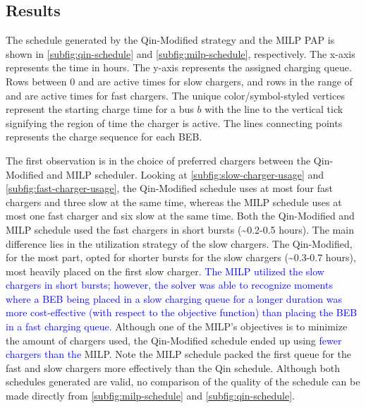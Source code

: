 \documentclass[utf8]{FrontiersinHarvard}
\newcommand{\fast}{15 }                                                         %
\newcommand{\slow}{15 }                                                         %
\begin{document}
\subsection{Results}
\label{results}
The schedule generated by the Qin-Modified strategy and the MILP PAP is shown in \autoref{subfig:qin-schedule} and
\autoref{subfig:milp-schedule}, respectively. The x-axis represents the time in hours. The y-axis represents the
assigned charging queue. Rows between 0 and \fpeval{\slow - 1} are active times for slow chargers, and rows in the range
of \fpeval{\slow - 1} and \fpeval{\fast + \slow - 1} are active times for fast chargers. The unique color/symbol-styled
vertices represent the starting charge time for a bus \(b\) with the line to the vertical tick signifying the region of
time the charger is active. The lines connecting points represents the charge sequence for each BEB.

The first observation is in the choice of preferred chargers between the Qin-Modified and MILP scheduler. Looking at
\autoref{subfig:slow-charger-usage} and \autoref{subfig:fast-charger-usage}, the Qin-Modified schedule uses at most four
fast chargers and three slow at the same time, whereas the MILP schedule uses at most one fast charger and six slow at
the same time. Both the Qin-Modified and MILP schedule used the fast chargers in short bursts (\textasciitilde{}0.2-0.5 hours). The main
difference lies in the utilization strategy of the slow chargers. The Qin-Modified, for the most part, opted for shorter
bursts for the slow chargers (\textasciitilde{}0.3-0.7 hours), most heavily placed on the first slow charger. \textcolor{blue}{The MILP utilized the slow chargers in short bursts; however, the solver was able to recognize moments where a BEB being placed in a slow charging queue for a longer duration was more cost-effective (with respect to the objective function) than placing the BEB in a fast charging queue.} Although one of the MILP's objectives is to minimize the amount of chargers
used, the Qin-Modified schedule ended up using \textcolor{blue}{fewer chargers than the} MILP. Note the MILP schedule
packed the first queue for the fast and slow chargers more effectively than the Qin schedule. Although both schedules
generated are valid, no comparison of the quality of the schedule can be made directly from
\autoref{subfig:milp-schedule} and \autoref{subfig:qin-schedule}.
\end{document}
